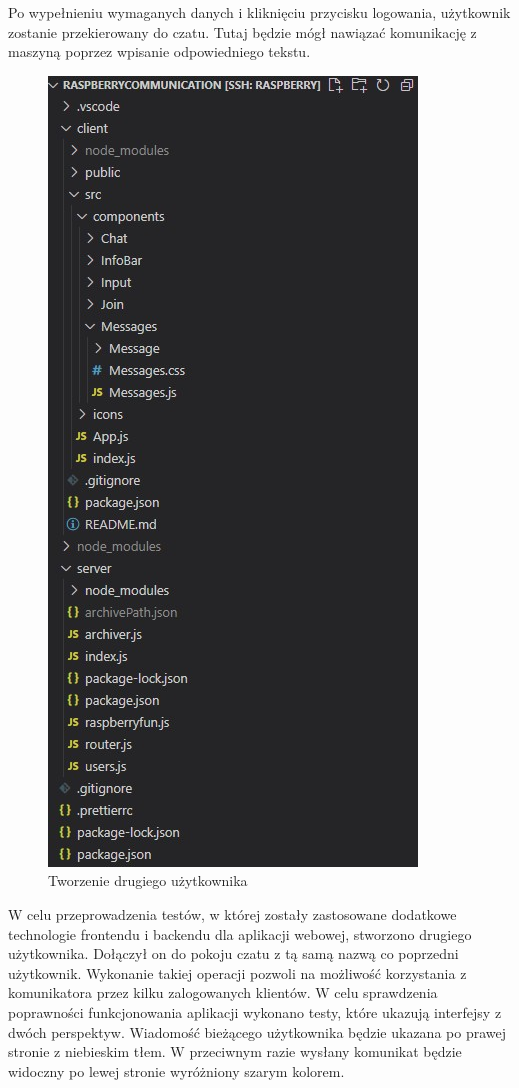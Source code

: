 Po wypełnieniu wymaganych danych i kliknięciu przycisku logowania, użytkownik zostanie przekierowany do czatu. Tutaj będzie mógł nawiązać komunikację z maszyną poprzez wpisanie odpowiedniego tekstu.
\begin{figure}
	\centering
	\includegraphics[width=0.5\linewidth]{"obrazy/model"}
	\caption{Tworzenie drugiego użytkownika}
	\label{fig:43}
\end{figure}
W celu przeprowadzenia testów, w której zostały zastosowane dodatkowe technologie frontendu i backendu dla aplikacji webowej, stworzono drugiego użytkownika. Dołączył on do pokoju czatu z tą samą nazwą co poprzedni użytkownik. Wykonanie takiej operacji pozwoli na możliwość korzystania z komunikatora przez kilku zalogowanych klientów.
W celu sprawdzenia poprawności funkcjonowania aplikacji wykonano testy, które ukazują interfejsy z  dwóch perspektyw. Wiadomość bieżącego użytkownika będzie ukazana po prawej stronie z niebieskim tłem. W przeciwnym razie wysłany komunikat będzie widoczny po lewej stronie wyróżniony szarym kolorem.
